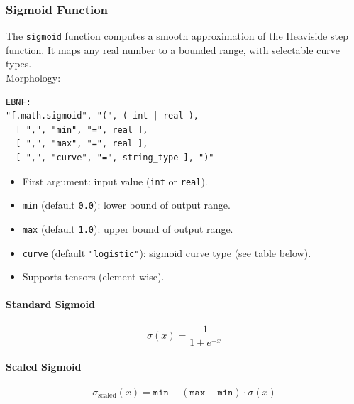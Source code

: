 \subsubsection{Sigmoid Function}
The \texttt{sigmoid} function computes a smooth approximation of the Heaviside step function. It maps any real number to a bounded range, with selectable curve types.\\
Morphology:
\begin{verbatim}
EBNF:
"f.math.sigmoid", "(", ( int | real ),
  [ ",", "min", "=", real ],
  [ ",", "max", "=", real ],
  [ ",", "curve", "=", string_type ], ")"
\end{verbatim}
\begin{itemize}
\item First argument: input value (\texttt{int} or \texttt{real}).
\item \texttt{min} (default \texttt{0.0}): lower bound of output range.
\item \texttt{max} (default \texttt{1.0}): upper bound of output range.
\item \texttt{curve} (default \texttt{"logistic"}): sigmoid curve type (see table below).
\item Supports tensors (element-wise).
\end{itemize}

\paragraph{Standard Sigmoid}
\[
\sigma(x) = \frac{1}{1 + e^{-x}}
\]

\paragraph{Scaled Sigmoid}
\[
\sigma_{\text{scaled}}(x) = \texttt{min} + (\texttt{max} - \texttt{min}) \cdot \sigma(x)
\]

